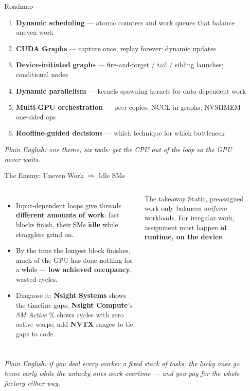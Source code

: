 \documentclass[aspectratio=169]{beamer}
\newcommand{\kw}[1]{\textbf{\textcolor{kwblue}{#1}}}
\newcommand{\pe}[1]{{\footnotesize\itshape Plain English: #1}}
\begin{document}
\begin{frame}{Roadmap}
  \begin{enumerate}
    \item \kw{Dynamic scheduling} --- atomic counters and work queues that balance uneven work
    \item \kw{CUDA Graphs} --- capture once, replay forever; dynamic updates
    \item \kw{Device-initiated graphs} --- fire-and-forget / tail / sibling launches; conditional nodes
    \item \kw{Dynamic parallelism} --- kernels spawning kernels for data-dependent work
    \item \kw{Multi-GPU orchestration} --- peer copies, NCCL in graphs, NVSHMEM one-sided ops
    \item \kw{Roofline-guided decisions} --- which technique for which bottleneck
  \end{enumerate}
  \medskip
  \pe{one theme, six tools: get the CPU out of the loop so the GPU never waits.}
\end{frame}

\begin{frame}{The Enemy: Uneven Work $\Rightarrow$ Idle SMs}
  \begin{columns}[c]
    \begin{itemize}
      \item Input-dependent loops give threads \kw{different amounts of work}:
            fast blocks finish, their SMs \kw{idle} while stragglers grind on.
      \item By the time the longest block finishes, much of the GPU has done nothing for a while ---
            \kw{low achieved occupancy}, wasted cycles.
      \item Diagnose it: \kw{Nsight Systems} shows the timeline gaps;
            \kw{Nsight Compute}'s \emph{SM Active} \% shows cycles with zero active warps;
            add \kw{NVTX} ranges to tie gaps to code.
    \end{itemize}
    \begin{block}{The takeaway}
      Static, preassigned work only balances \emph{uniform} workloads.
      For irregular work, assignment must happen \kw{at runtime, on the device}.
    \end{block}
  \end{columns}
  \medskip
  \pe{if you deal every worker a fixed stack of tasks, the lucky ones go home early while the unlucky ones work overtime --- and you pay for the whole factory either way.}
\end{frame}
\end{document}
